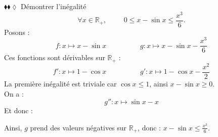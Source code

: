 \documentclass[11pt]{article}
\begin{document}
\begin{exercice}{$\blacklozenge\blacklozenge\lozenge$}{}
    Démontrer l'inégalité
    \begin{equation*}
        \forall{x\in\mathbb{R}_+}, \hspace{1cm} 0\leq x-\sin x\leq\frac{x^3}{6}.
    \end{equation*}
    \tcblower
    Posons :
    \begin{equation*}
        f:x\mapsto x-\sin x \hspace{2cm} g:x\mapsto x-\sin x - \frac{x^3}{6}
    \end{equation*}
    Ces fonctions sont dérivables sur $\mathbb{R}_+$ :
    \begin{equation*}
        f':x\mapsto 1-\cos x \hspace {2cm} g':x\mapsto 1-\cos x - \frac{x^2}{2}
    \end{equation*}
    La première inégalité est triviale car $\cos x\leq1$, ainsi $x-\sin x\geq 0$.\\
    On a :
    \begin{equation*}
        g'':x\mapsto\sin x - x
    \end{equation*}
    Et donc :
    \begin{center}
    \end{center}
    Ainsi, $g$ prend des valeurs négatives sur $\mathbb{R}_+$, donc : $x-\sin x\leq\frac{x^3}{6}$.
\end{exercice}
\end{document}
